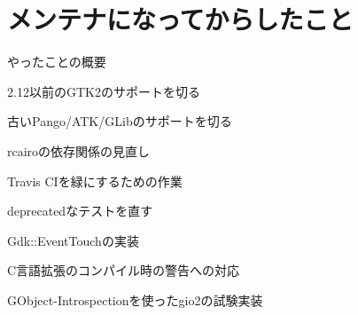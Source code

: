 \section{メンテナになってからしたこと}

\begin{frame}
\begin{block}{やったことの概要}
\begin{itemize}
{\Large
\item 2.12以前のGTK2のサポートを切る
\item 古いPango/ATK/GLibのサポートを切る
\item rcairoの依存関係の見直し
\item Travis CIを緑にするための作業
\item deprecatedなテストを直す
\item Gdk::EventTouchの実装
\item C言語拡張のコンパイル時の警告への対応
\item GObject-Introspectionを使ったgio2の試験実装
}
\end{itemize}
\end{block}
\end{frame}
